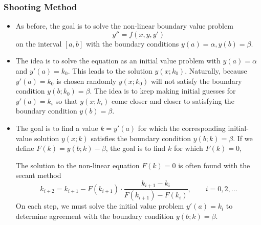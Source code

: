 \documentclass[11pt, a4paper]{article}
\begin{document}
\subsubsection{Shooting Method}
\begin{itemize}
	\item As before, the goal is to solve the non-linear boundary value problem
	\begin{equation*}
		y'' = f(x, y, y')
	\end{equation*}
	on the interval $ [a, b] $ with the boundary conditions $ y(a) = \alpha, y(b) = \beta $.
	
	\item The idea is to solve the equation as an initial value problem with $ y(a) = \alpha $ and $ y'(a) = k_{0} $. This leads to the solution $ y(x; k_{0}) $. Naturally, because $ y'(a) = k_{0}  $ is chosen randomly $ y(x; k_{0}) $ will not satisfy the boundary condition $ y(b;k_{0}) = \beta $. The idea is to keep making initial guesses for $ y'(a) = k_{i} $ so that $ y(x;k_{i}) $ come closer and closer to satisfying the boundary condition $ y(b) = \beta $.
	
	\item The goal is to find a value $ k = y'(a) $ for which the corresponding initial-value solution $ y(x;k) $ satisfies the boundary condition $ y(b;k) = \beta $. If we define $ F(k) = y(b; k) - \beta $, the goal is to find $ k $ for which $ F(k) = 0 $, 
	
	The solution to the non-linear equation $ F(k) = 0  $ is often found with the secant method
	\begin{equation*}
		k_{i+2} = k_{i+1} - F(k_{i+1}) \cdot \frac{k_{i+1} - k_{i}}{F(k_{i+1}) - F(k_{i})}, \qquad i = 0, 2, \ldots
	\end{equation*}
	On each step, we must solve the initial value problem $ y'(a) = k_{i} $ to determine agreement with the boundary condition $ y(b;k) = \beta $.
	
\end{itemize}
\end{document}
